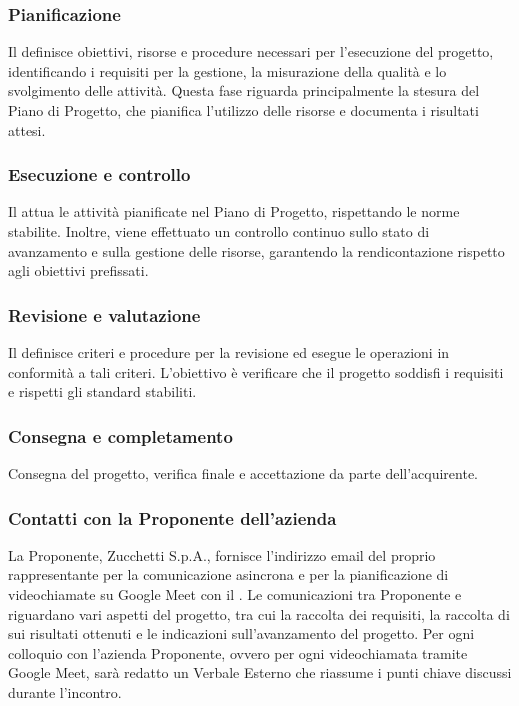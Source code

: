 \subsubsection{Pianificazione}
Il  definisce obiettivi, risorse e procedure necessari per l’esecuzione del progetto, identificando i requisiti per la gestione, la misurazione della qualità e lo svolgimento delle attività. Questa fase riguarda principalmente la stesura del Piano di Progetto, che pianifica l’utilizzo delle risorse e documenta i risultati attesi.

\subsubsection{Esecuzione e controllo}
Il  attua le attività pianificate nel Piano di Progetto, rispettando le norme stabilite. Inoltre, viene effettuato un controllo continuo sullo stato di avanzamento e sulla gestione delle risorse, garantendo la rendicontazione rispetto agli obiettivi prefissati. 

\subsubsection{Revisione e valutazione}
Il  definisce criteri e procedure per la revisione ed esegue le operazioni in conformità a tali criteri. L'obiettivo è verificare che il progetto soddisfi i requisiti e rispetti gli standard stabiliti.

\subsubsection{Consegna e completamento}
Consegna del progetto, verifica finale e accettazione da parte dell’acquirente.

\subsubsection{Contatti con la Proponente dell’azienda}
La Proponente, Zucchetti S.p.A., fornisce l'indirizzo email del proprio rappresentante per la comunicazione asincrona e per la pianificazione di videochiamate su Google Meet con il . 
Le comunicazioni tra Proponente e  riguardano vari aspetti del progetto, tra cui la raccolta dei requisiti, la raccolta di  sui risultati ottenuti e le indicazioni sull'avanzamento del progetto. 
Per ogni colloquio con l'azienda Proponente, ovvero per ogni videochiamata tramite Google Meet, sarà redatto un Verbale Esterno che riassume i punti chiave discussi durante l'incontro.

